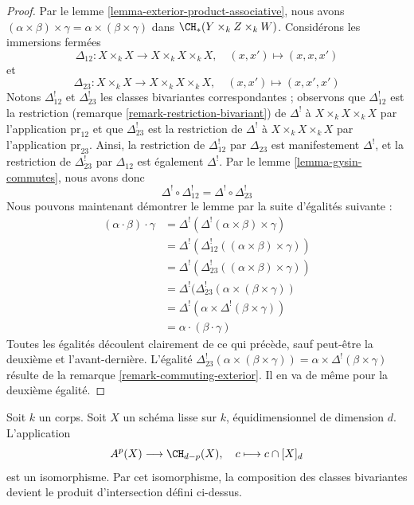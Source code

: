 \begin{proof}
Par le lemme \ref{lemma-exterior-product-associative}, nous avons
$(\alpha \times \beta) \times \gamma =
\alpha \times (\beta \times \gamma)$ dans $\CH_*(Y \times_k Z \times_k W)$.
Considérons les immersions fermées
$$
\Delta_{12} : X \times_k X \longrightarrow X \times_k X \times_k X,
\quad (x, x') \mapsto (x, x, x')
$$
et
$$
\Delta_{23} : X \times_k X \longrightarrow X \times_k X \times_k X,
\quad (x, x') \mapsto (x, x', x')
$$
Notons $\Delta_{12}^!$ et $\Delta_{23}^!$ les classes bivariantes
correspondantes ; observons que $\Delta_{12}^!$ est la restriction
(remarque \ref{remark-restriction-bivariant}) de $\Delta^!$
à $X \times_k X \times_k X$ par l'application $\text{pr}_{12}$ et que
$\Delta_{23}^!$ est la restriction de $\Delta^!$
à $X \times_k X \times_k X$ par l'application $\text{pr}_{23}$.
Ainsi, la restriction de $\Delta_{12}^!$ par $\Delta_{23}$ est manifestement
$\Delta^!$, et la restriction de $\Delta_{23}^!$ par $\Delta_{12}$ est
également $\Delta^!$. Par le lemme \ref{lemma-gysin-commutes}, nous avons donc
$$
\Delta^! \circ \Delta_{12}^! =
\Delta^! \circ \Delta_{23}^! 
$$
Nous pouvons maintenant démontrer le lemme par la suite d'égalités suivante :
\begin{align*}
(\alpha \cdot \beta) \cdot \gamma
& =
\Delta^!(\Delta^!(\alpha \times \beta) \times \gamma) \\
& =
\Delta^!(\Delta_{12}^!((\alpha \times \beta) \times \gamma)) \\
& =
\Delta^!(\Delta_{23}^!((\alpha \times \beta) \times \gamma)) \\
& =
\Delta^!(\Delta_{23}^!(\alpha \times (\beta \times \gamma)) \\
& =
\Delta^!(\alpha \times \Delta^!(\beta \times \gamma)) \\
& =
\alpha \cdot (\beta \cdot \gamma)
\end{align*}
Toutes les égalités découlent clairement de ce qui précède, sauf peut-être
la deuxième et l'avant-dernière. L'égalité
$\Delta_{23}^!(\alpha \times (\beta \times \gamma)) =
\alpha \times \Delta^!(\beta \times \gamma)$ résulte de la
remarque \ref{remark-commuting-exterior}. Il en va de même pour la deuxième
égalité.
\end{proof}

\begin{lemma}
\label{lemma-identify-chow-for-smooth}
Soit $k$ un corps. Soit $X$ un schéma lisse sur $k$, équidimensionnel
de dimension $d$. L'application
$$
A^p(X) \longrightarrow \CH_{d - p}(X),\quad
c \longmapsto c \cap [X]_d
$$
est un isomorphisme. Par cet isomorphisme, la composition des classes
bivariantes devient le produit d'intersection défini ci-dessus.
\end{lemma}


